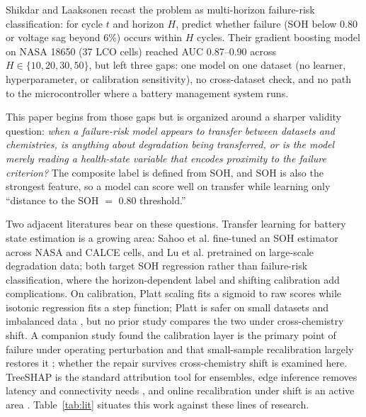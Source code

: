 \documentclass[preprint,12pt]{elsarticle}
\begin{document}
Shikdar and Laaksonen \cite{shikdar2026learning} recast the problem as multi-horizon failure-risk classification: for cycle $t$ and horizon $H$, predict whether failure (SOH below 0.80 or voltage sag beyond 6\%) occurs within $H$ cycles. Their gradient boosting model on NASA 18650 (37 LCO cells) reached AUC 0.87--0.90 across $H \in \{10,20,30,50\}$, but left three gaps: one model on one dataset (no learner, hyperparameter, or calibration sensitivity), no cross-dataset check, and no path to the microcontroller where a battery management system runs.

This paper begins from those gaps but is organized around a sharper validity question: \emph{when a failure-risk model appears to transfer between datasets and chemistries, is anything about degradation being transferred, or is the model merely reading a health-state variable that encodes proximity to the failure criterion?} The composite label is defined from SOH, and SOH is also the strongest feature, so a model can score well on transfer while learning only ``distance to the SOH $=$ 0.80 threshold.''

Two adjacent literatures bear on these questions. Transfer learning for battery state estimation is a growing area: Sahoo et al. \cite{sahoo2022transfer} fine-tuned an SOH estimator across NASA and CALCE cells, and Lu et al. \cite{lu2023deep} pretrained on large-scale degradation data; both target SOH regression rather than failure-risk classification, where the horizon-dependent label and shifting calibration add complications. On calibration, Platt scaling \cite{platt1999probabilistic} fits a sigmoid to raw scores while isotonic regression \cite{zadrozny2002transforming} fits a step function; Platt is safer on small datasets \cite{niculescu2005predicting} and imbalanced data \cite{huang2020experimental}, but no prior study compares the two under cross-chemistry shift. A companion study found the calibration layer is the primary point of failure under operating perturbation and that small-sample recalibration largely restores it \cite{shikdar2026robustness}; whether the repair survives cross-chemistry shift is examined here. TreeSHAP \cite{lundberg2020from} is the standard attribution tool for ensembles, edge inference removes latency and connectivity needs \cite{grzesik2024combining}, and online recalibration under shift is an active area \cite{gupta2023online}. Table~\ref{tab:lit} situates this work against these lines of research.
\end{document}
